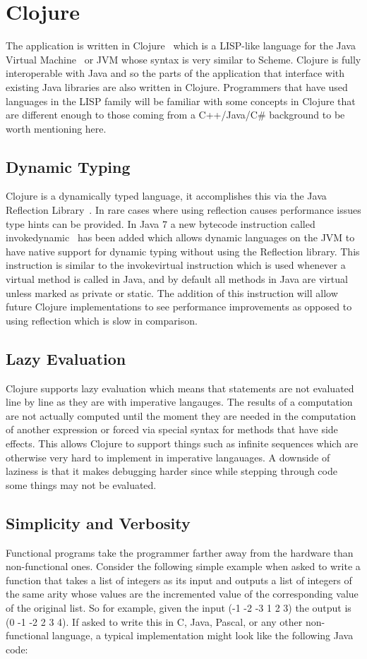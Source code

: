 \section{Clojure}
The application is written in Clojure~\cite{clj} which is a LISP-like language for the Java Virtual Machine~\cite{jvm} or JVM whose syntax is very similar to Scheme. Clojure is fully interoperable with Java and so the parts of the application that interface with existing Java libraries are also written in Clojure.
Programmers that have used languages in the LISP family will be familiar with some concepts in Clojure
that are different enough to those coming from a C++/Java/C\# background to be worth mentioning here. 

\subsection{Dynamic Typing}
Clojure is a dynamically typed language, it accomplishes this via the Java Reflection Library~\cite{reflection}. In rare cases where using reflection causes performance issues type hints can be provided. In Java 7 a new bytecode instruction called invokedynamic~\cite{invokedynamic} has been added which allows dynamic languages on the JVM to have native support for dynamic typing without using the Reflection library. This instruction is similar to the invokevirtual instruction which is used whenever a virtual method is called in Java, and by default all methods in Java are virtual unless marked as private or static. The addition of this instruction will allow future Clojure implementations to see performance improvements as opposed to using reflection which is slow in comparison.  

\subsection{Lazy Evaluation}
Clojure supports lazy evaluation which means that statements are not evaluated line by line as they are with imperative langauges. The results of a computation are not actually computed until the moment they are needed in the computation of another expression or forced via special syntax for methods that have side effects. This allows Clojure to support things such as infinite sequences which are otherwise very hard to implement in imperative langauages. A downside of laziness is that it makes debugging harder since while stepping through code some things may not be evaluated. 

\subsection{Simplicity and Verbosity}
Functional programs take the programmer farther away from the hardware than non-functional ones. Consider the following simple example when asked to write a function that takes a list of integers as its input and outputs a list of integers of the same arity whose values are the incremented value of the corresponding value of the original list. So for example, given the input (-1 -2 -3 1 2 3) the output is (0 -1 -2 2 3 4). If asked to write this in C, Java, Pascal, or any other non-functional language, a typical implementation might look like the following Java code: 

